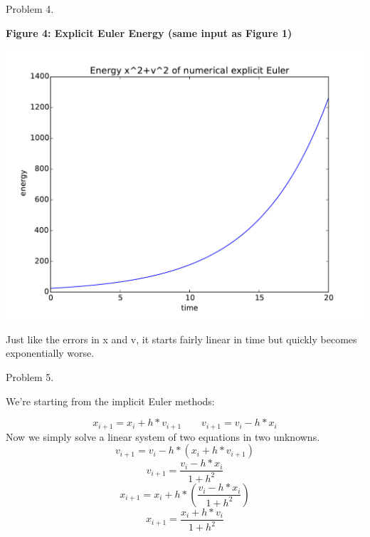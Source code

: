 \documentclass{article}
\begin{document}
\bigskip

\clearpage

Problem 4.

\begin{center}
    \textbf{Figure 4: Explicit Euler Energy (same input as Figure 1)}\par\medskip
    \includegraphics[scale=1.0]{eE_energy}
\end{center}

Just like the errors in x and v, it starts fairly linear in time but quickly becomes exponentially worse.


\bigskip

Problem 5.

We're starting from the implicit Euler methods:

\begin{equation}
    x_{i+1} = x_{i} + h*v_{i+1}  \qquad   v_{i+1} = v_{i} - h*x_{i}
\end{equation}
Now we simply solve a linear system of two equations in two unknowns.
\begin{equation}
    v_{i+1} = v_{i} - h*(x_{i} + h*v_{i+1})
\end{equation}
\begin{equation}
    v_{i+1} = \frac{v_{i} - h*x_{i}}{1 + h^2}
\end{equation}
\begin{equation}
    x_{i+1} = x_{i} + h*(\frac{v_{i} - h*x_{i}}{1 + h^2})
\end{equation}
\begin{equation}
    x_{i+1} = \frac{x_{i} + h*v_{i}}{1 + h^2}
\end{equation}
\end{document}
